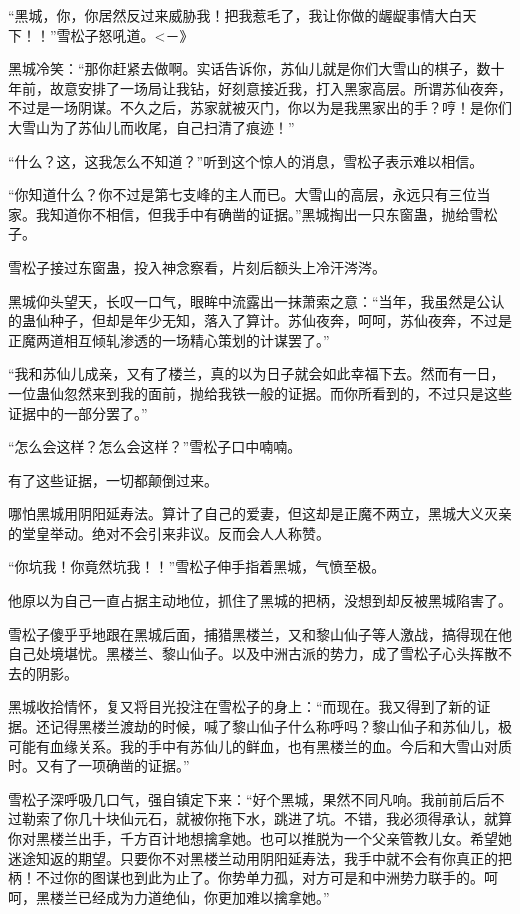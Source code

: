
\begin{this_body}

“黑城，你，你居然反过来威胁我！把我惹毛了，我让你做的龌龊事情大白天下！！”雪松子怒吼道。<－》

黑城冷笑：“那你赶紧去做啊。实话告诉你，苏仙儿就是你们大雪山的棋子，数十年前，故意安排了一场局让我钻，好刻意接近我，打入黑家高层。所谓苏仙夜奔，不过是一场阴谋。不久之后，苏家就被灭门，你以为是我黑家出的手？哼！是你们大雪山为了苏仙儿而收尾，自己扫清了痕迹！”

“什么？这，这我怎么不知道？”听到这个惊人的消息，雪松子表示难以相信。

“你知道什么？你不过是第七支峰的主人而已。大雪山的高层，永远只有三位当家。我知道你不相信，但我手中有确凿的证据。”黑城掏出一只东窗蛊，抛给雪松子。

雪松子接过东窗蛊，投入神念察看，片刻后额头上冷汗涔涔。

黑城仰头望天，长叹一口气，眼眸中流露出一抹萧索之意：“当年，我虽然是公认的蛊仙种子，但却是年少无知，落入了算计。苏仙夜奔，呵呵，苏仙夜奔，不过是正魔两道相互倾轧渗透的一场精心策划的计谋罢了。”

“我和苏仙儿成亲，又有了楼兰，真的以为日子就会如此幸福下去。然而有一日，一位蛊仙忽然来到我的面前，抛给我铁一般的证据。而你所看到的，不过只是这些证据中的一部分罢了。”

“怎么会这样？怎么会这样？”雪松子口中喃喃。

有了这些证据，一切都颠倒过来。

哪怕黑城用阴阳延寿法。算计了自己的爱妻，但这却是正魔不两立，黑城大义灭亲的堂皇举动。绝对不会引来非议。反而会人人称赞。

“你坑我！你竟然坑我！！”雪松子伸手指着黑城，气愤至极。

他原以为自己一直占据主动地位，抓住了黑城的把柄，没想到却反被黑城陷害了。

雪松子傻乎乎地跟在黑城后面，捕猎黑楼兰，又和黎山仙子等人激战，搞得现在他自己处境堪忧。黑楼兰、黎山仙子。以及中洲古派的势力，成了雪松子心头挥散不去的阴影。

黑城收拾情怀，复又将目光投注在雪松子的身上：“而现在。我又得到了新的证据。还记得黑楼兰渡劫的时候，喊了黎山仙子什么称呼吗？黎山仙子和苏仙儿，极可能有血缘关系。我的手中有苏仙儿的鲜血，也有黑楼兰的血。今后和大雪山对质时。又有了一项确凿的证据。”

雪松子深呼吸几口气，强自镇定下来：“好个黑城，果然不同凡响。我前前后后不过勒索了你几十块仙元石，就被你拖下水，跳进了坑。不错，我必须得承认，就算你对黑楼兰出手，千方百计地想擒拿她。也可以推脱为一个父亲管教儿女。希望她迷途知返的期望。只要你不对黑楼兰动用阴阳延寿法，我手中就不会有你真正的把柄！不过你的图谋也到此为止了。你势单力孤，对方可是和中洲势力联手的。呵呵，黑楼兰已经成为力道绝仙，你更加难以擒拿她。”


\end{this_body}
